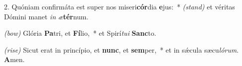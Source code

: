 2. Quóniam confirmáta est super nos miseri\textbf{cór}dia \textbf{e}jus:~* {\color{red}\textit{(stand)}} et véritas Dómini manet \textit{in} \textit{æ}\textbf{tér}num.

{\color{red}\textit{(bow)}} Glória \textbf{Pa}tri, et \textbf{Fí}lio,~* et Spirí\textit{tu}\textit{i} \textbf{Sanc}to.

{\color{red}\textit{(rise)}} Sicut erat in princípio, et \textbf{nunc}, et \textbf{sem}per,~* et in s\'{\ae}cula sæcu\textit{ló}\textit{rum}. \textbf{A}men.